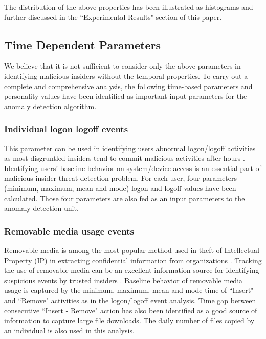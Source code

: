 \documentclass[conference,draftclsnofoot,onecolumn]{IEEEtran}%
\begin{document}
The distribution of the above properties has been illustrated as histograms and further discussed in the ``Experimental Results" section of this paper.

\subsection{Time Dependent Parameters}
We believe that it is not sufficient to consider only the above parameters in identifying malicious insiders without the temporal properties. To carry out a  complete and comprehensive analysis, the following time-based parameters and personality values have been  identified as important input parameters for the anomaly detection algorithm.

\subsubsection{Individual logon logoff events}
This parameter can be used in identifying users abnormal logon/logoff activities as most disgruntled insiders tend to commit malicious activities after hours \cite{CappelliTheCERT2012}. Identifying users' baseline behavior on system/device access is  an essential part of malicious insider threat detection problem. For each user, four parameters (minimum, maximum, mean and mode) logon and logoff values have been calculated. Those four parameters are also fed as an input parameters to the anomaly detection unit.
	
\subsubsection{Removable media usage events}
Removable media is among the most popular method used in theft of Intellectual Property (IP) in extracting confidential information from organizations \cite{CappelliTheCERT2012}. Tracking the use of removable media can  be an excellent information source for identifying suspicious events by trusted insiders . Baseline behavior of removable media usage is captured by the minimum, maximum, mean and mode time of ``Insert" and ``Remove" activities as in the logon/logoff event analysis. Time gap between consecutive ``Insert - Remove" action has also been identified as a good source of information to capture large file downloads.  The daily number of files copied by an individual is also used in this analysis.
	
\end{document}
